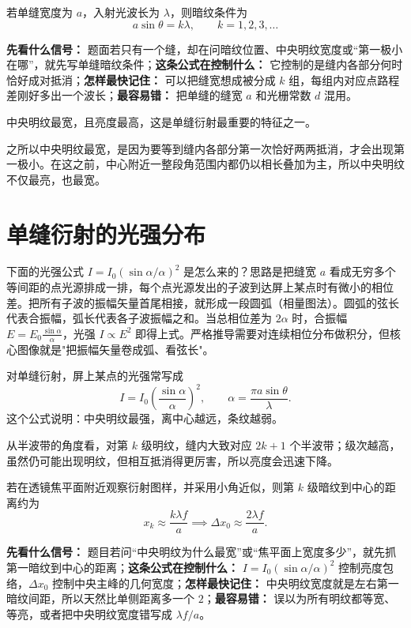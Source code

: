 \documentclass[lang=cn,11pt]{elegantbook}
\newcommand{\bridge}[1]{\begin{note}#1\end{note}}
\begin{document}
若单缝宽度为 \(a\)，入射光波长为 \(\lambda\)，则暗纹条件为
\[
a\sin\theta=k\lambda,\qquad k=1,2,3,\dots
\]

\begin{note}
\textbf{先看什么信号：} 题面若只有一个缝，却在问暗纹位置、中央明纹宽度或“第一极小在哪”，就先写单缝暗纹条件；\textbf{这条公式在控制什么：} 它控制的是缝内各部分何时恰好成对抵消；\textbf{怎样最快记住：} 可以把缝宽想成被分成 \(k\) 组，每组内对应点路程差刚好多出一个波长；\textbf{最容易错：} 把单缝的缝宽 \(a\) 和光栅常数 \(d\) 混用。
\end{note}

中央明纹最宽，且亮度最高，这是单缝衍射最重要的特征之一。

之所以中央明纹最宽，是因为要等到缝内各部分第一次恰好两两抵消，才会出现第一极小。在这之前，中心附近一整段角范围内都仍以相长叠加为主，所以中央明纹不仅最亮，也最宽。

\section{单缝衍射的光强分布}

\bridge{下面的光强公式 \(I=I_0(\sin\alpha/\alpha)^2\) 是怎么来的？思路是把缝宽 \(a\) 看成无穷多个等间距的点光源排成一排，每个点光源发出的子波到达屏上某点时有微小的相位差。把所有子波的振幅矢量首尾相接，就形成一段圆弧（相量图法）。圆弧的弦长代表合振幅，弧长代表各子波振幅之和。当总相位差为 \(2\alpha\) 时，合振幅 \(E=E_0\frac{\sin\alpha}{\alpha}\)，光强 \(I\propto E^2\) 即得上式。严格推导需要对连续相位分布做积分，但核心图像就是"把振幅矢量卷成弧、看弦长"。}

对单缝衍射，屏上某点的光强常写成
\[
I=I_0\left(\frac{\sin\alpha}{\alpha}\right)^2,
\qquad
\alpha=\frac{\pi a\sin\theta}{\lambda}.
\]
这个公式说明：中央明纹最强，离中心越远，条纹越弱。

从半波带的角度看，对第 \(k\) 级明纹，缝内大致对应 \(2k+1\) 个半波带；级次越高，虽然仍可能出现明纹，但相互抵消得更厉害，所以亮度会迅速下降。

若在透镜焦平面附近观察衍射图样，并采用小角近似，则第 \(k\) 级暗纹到中心的距离约为
\[
x_k\approx \frac{k\lambda f}{a}
\implies
\Delta x_0\approx \frac{2\lambda f}{a}.
\]

\begin{note}
\textbf{先看什么信号：} 题目若问“中央明纹为什么最宽”或“焦平面上宽度多少”，就先抓第一暗纹到中心的距离；\textbf{这条公式在控制什么：} \(I=I_0(\sin\alpha/\alpha)^2\) 控制亮度包络，\(\Delta x_0\) 控制中央主峰的几何宽度；\textbf{怎样最快记住：} 中央明纹宽度就是左右第一暗纹间距，所以天然比单侧距离多一个 \(2\)；\textbf{最容易错：} 误以为所有明纹都等宽、等亮，或者把中央明纹宽度错写成 \(\lambda f/a\)。
\end{note}
\end{document}
